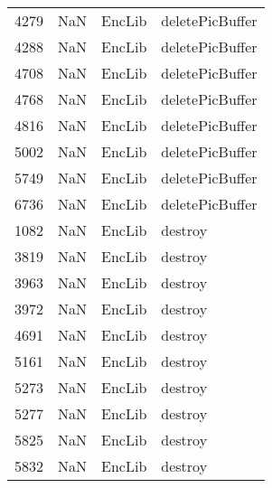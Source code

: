 \begin{tabular}{llll}
4279 &                   NaN &                     EncLib &                           deletePicBuffer \\
4288 &                   NaN &                     EncLib &                           deletePicBuffer \\
4708 &                   NaN &                     EncLib &                           deletePicBuffer \\
4768 &                   NaN &                     EncLib &                           deletePicBuffer \\
4816 &                   NaN &                     EncLib &                           deletePicBuffer \\
5002 &                   NaN &                     EncLib &                           deletePicBuffer \\
5749 &                   NaN &                     EncLib &                           deletePicBuffer \\
6736 &                   NaN &                     EncLib &                           deletePicBuffer \\
1082 &                   NaN &                     EncLib &                                   destroy \\
3819 &                   NaN &                     EncLib &                                   destroy \\
3963 &                   NaN &                     EncLib &                                   destroy \\
3972 &                   NaN &                     EncLib &                                   destroy \\
4691 &                   NaN &                     EncLib &                                   destroy \\
5161 &                   NaN &                     EncLib &                                   destroy \\
5273 &                   NaN &                     EncLib &                                   destroy \\
5277 &                   NaN &                     EncLib &                                   destroy \\
5825 &                   NaN &                     EncLib &                                   destroy \\
5832 &                   NaN &                     EncLib &                                   destroy \\

\end{tabular}
